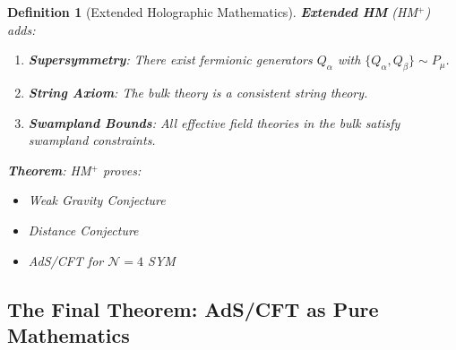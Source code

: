 \documentclass[12pt,a4paper]{article}
\newtheorem{definition}[theorem]{Definition}
\begin{document}
\begin{definition}[Extended Holographic Mathematics]\label{def:extended-hm}
\textbf{Extended HM} (HM$^+$) adds:
\begin{enumerate}
    \item[\textbf{HM12.}] \textbf{Supersymmetry}: There exist fermionic generators $Q_\alpha$ with $\{Q_\alpha, Q_\beta\} \sim P_\mu$.
    
    \item[\textbf{HM13.}] \textbf{String Axiom}: The bulk theory is a consistent string theory.
    
    \item[\textbf{HM14.}] \textbf{Swampland Bounds}: All effective field theories in the bulk satisfy swampland constraints.
\end{enumerate}

\textbf{Theorem}: HM$^+$ proves:
\begin{itemize}
    \item Weak Gravity Conjecture
    \item Distance Conjecture
    \item AdS/CFT for $\mathcal{N}=4$ SYM
\end{itemize}
\end{definition}

\subsection{The Final Theorem: AdS/CFT as Pure Mathematics}
\end{document}
